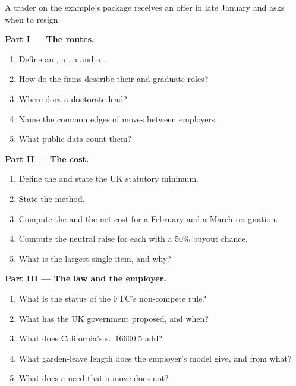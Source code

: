 \begin{problem}\label{pb:in:career-paths-and-moves:1}
A trader on the example's package receives an offer in late January and asks when to resign.

\medskip\noindent\textbf{Part I --- The routes.}
\begin{enumerate}
\item Define an , a , a  and a .
\item How do the firms describe their  and graduate roles?
\item Where does a doctorate lead?
\item Name the common edges of moves between employers.
\item What public data count them?
\end{enumerate}

\medskip\noindent\textbf{Part II --- The cost.}
\begin{enumerate}[resume]
\item Define the  and state the UK statutory minimum.
\item State the method.
\item Compute the  and the net cost for a February and a March resignation.
\item Compute the neutral raise for each with a 50\% buyout chance.
\item What is the largest single item, and why?
\end{enumerate}

\medskip\noindent\textbf{Part III --- The law and the employer.}
\begin{enumerate}[resume]
\item What is the status of the FTC's non-compete rule?
\item What has the UK government proposed, and when?
\item What does California's s.~16600.5 add?
\item What garden-leave length does the employer's model give, and from what?
\item What does a  need that a move does not?
\end{enumerate}


\end{problem}
